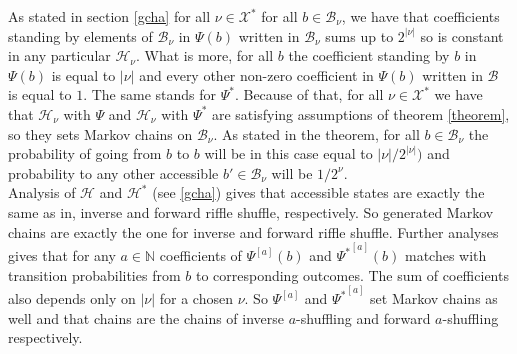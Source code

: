 \documentclass[a4paper, 12pt]{article}
\begin{document}
As stated in section \ref{gcha} for all $\nu \in \mathcal{X}^*$ for all $b \in \mathcal{B}_\nu$,
we have that coefficients standing by elements of $\mathcal{B}_\nu$
in $\Psi(b)$ written in $\mathcal{B}_\nu$ sums up to $2^{|\nu|}$ so is constant in any particular
$\mathcal{H}_\nu$. What is more, for all $b$ the coefficient standing by $b$ in $\Psi(b)$ is equal to
$|\nu|$ and every other non-zero coefficient in $\Psi(b)$ written in $\mathcal{B}$ is equal to $1$.
The same stands for $\Psi^*$. Because of that, for all $\nu \in \mathcal{X}^*$ we have that
$\mathcal{H}_\nu$ with $\Psi$ and $\mathcal{H}_\nu$ with $\Psi^*$ are satisfying assumptions of
theorem \ref{theorem}, so they sets Markov chains on $\mathcal{B}_\nu$. As stated in the theorem,
for all $b \in \mathcal{B}_\nu$ the probability of going from $b$ to $b$ will be in this case equal to
$|\nu|/2^{|\nu|})$ and probability to any other accessible $b' \in \mathcal{B}_\nu$ will be $1/2^\nu$. \\
Analysis of $\mathcal{H}$ and $\mathcal{H}^*$ (see \ref{gcha}) gives that accessible states are exactly
the same as in, inverse and forward riffle shuffle, respectively. So generated Markov chains are exactly
the one for inverse and forward riffle shuffle.
Further analyses gives that for any $a \in \mathbb{N}$ coefficients of $\Psi^{[a]}(b)$ and ${\Psi^*}^{[a]}(b)$
matches with transition probabilities from $b$ to corresponding outcomes. The sum of coefficients also
depends only on $|\nu|$ for a chosen $\nu$. So $\Psi^{[a]}$ and ${\Psi^*}^{[a]}$ set Markov chains as well
and that chains are the chains of inverse $a$-shuffling and forward $a$-shuffling respectively.
\end{document}
